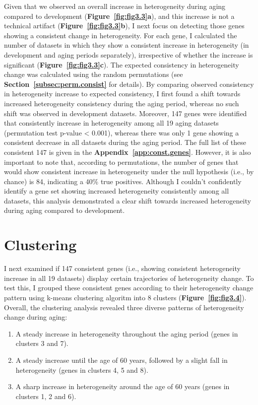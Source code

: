 Given that we observed an overall increase in heterogeneity during aging compared to development (\textbf{Figure~\ref{fig:fig3.3}a}),
and this increase is not a technical artifact (\textbf{Figure~\ref{fig:fig3.3}b}), I next focus on detecting those genes showing a consistent change in heterogeneity. 
For each gene, I calculated the number of datasets in which they show a  consistent increase in heterogeneity (in development and aging periods separately), 
irrespective of whether the increase is significant (\textbf{Figure~\ref{fig:fig3.3}c}).
The expected consistency in heterogeneity change was calculated using the random permutations (see \textbf{Section~\ref{subsec:perm.consist}} for details).
By comparing observed consistency in heterogeneity increase to expected consistency, I first found a shift towards increased heterogeneity consistency
during the aging period, whereas no such shift was observed in development datasets.
Moreover, 147 genes were identified that consistently increase in heterogeneity among all 19 aging datasets (permutation test p-value < 0.001), 
whereas there was only 1 gene showing a consistent decrease in all datasets during the aging period.
The full list of these consistent 147 is given in the \textbf{Appendix~\ref{app:const.genes}}.
However, it is also important to note that, according to permutations, 
the number of genes that would show consistent increase in heterogeneity under the null hypothesis (i.e., by chance) is 84,
indicating a 40\% true positives.
Although I couldn't confidently identify a gene set showing increased heterogeneity consistently among all datasets,
this analysis demonstrated a clear shift towards increased heterogeneity during aging compared to development. 

\section{Clustering}
I next examined if 147 consistent genes (i.e., showing consistent heterogeneity increase in all 19 datasets) display certain trajectories of heterogeneity change.
To test this, I grouped these consistent genes according to their heterogeneity change pattern using k-means clustering algoritm into 8 clusters (\textbf{Figure~\ref{fig:fig3.4}}).
Overall, the clustering analysis revealed three diverse patterns of heterogeneity change during aging:

\begin{enumerate}
    \item A steady increase in heterogeneity throughout the aging period (genes in clusters 3 and 7).
    \item A steady increase until the age of 60 years, followed by a slight fall in heterogeneity (genes in clusters 4, 5 and 8).
    \item A sharp increase in heterogeneity around the age of 60 years (genes in clusters 1, 2 and 6).
\end{enumerate}


